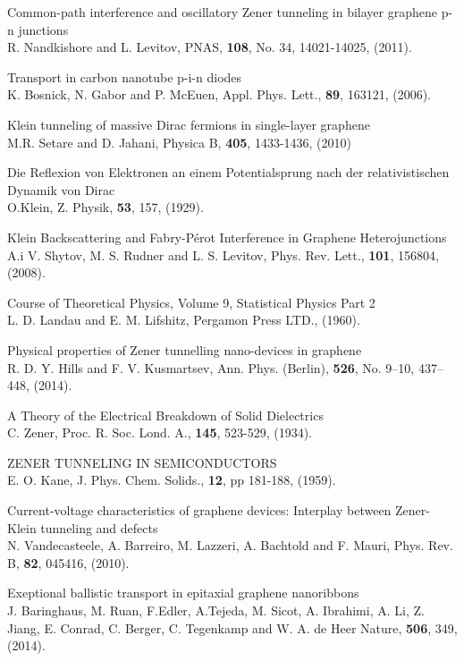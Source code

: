 \documentclass[12pt,a4paper]{report}
\begin{document}
\begin{thebibliography}{10}
 Common-path interference and oscillatory Zener tunneling in bilayer graphene p-n junctions\\
R. Nandkishore and L. Levitov,
PNAS, {\bf 108}, No. 34, 14021-14025, (2011).

Transport in carbon nanotube p-i-n diodes\\
K. Bosnick, N. Gabor and P. McEuen,
Appl. Phys. Lett., {\bf 89}, 163121, (2006).

 Klein tunneling of massive Dirac fermions in single-layer graphene\\
M.R. Setare and D. Jahani,
\newblock Physica B, {\bf 405}, 1433-1436, (2010)

 Die Reflexion von Elektronen an einem Potentialsprung nach der relativistischen Dynamik von Dirac\\
O.Klein,
Z. Physik, {\bf 53}, 157, (1929).

 Klein Backscattering and Fabry-Pérot Interference in Graphene Heterojunctions\\
A.i V. Shytov, M. S. Rudner and L. S. Levitov,
Phys. Rev. Lett., {\bf 101}, 156804, (2008).

 Course of Theoretical Physics, Volume 9, Statistical Physics Part 2\\
L. D. Landau and E. M. Lifshitz,
Pergamon Press LTD., (1960).

Physical properties of Zener tunnelling nano-devices in graphene\\
R. D. Y. Hills and F. V. Kusmartsev,
Ann. Phys. (Berlin), {\bf 526}, No. 9–10, 437–448, (2014).

 A Theory of the Electrical Breakdown of Solid Dielectrics\\
C. Zener,
Proc. R. Soc. Lond. A., {\bf 145}, 523-529, (1934).

 ZENER TUNNELING IN SEMICONDUCTORS\\
E. O. Kane,
J. Phys. Chem. Solids., {\bf 12}, pp 181-188, (1959).

Current-voltage characteristics of graphene devices: Interplay between Zener-Klein tunneling and defects\\
N. Vandecasteele, A. Barreiro, M. Lazzeri, A. Bachtold and F. Mauri,
Phys. Rev. B, {\bf 82}, 045416, (2010).

 Exeptional ballistic transport in epitaxial graphene nanoribbons\\
J. Baringhaus, M. Ruan, F.Edler, A.Tejeda, M. Sicot, A. Ibrahimi, A. Li, Z. Jiang, E. Conrad, C. Berger, C. Tegenkamp and W. A. de Heer
Nature, {\bf 506}, 349, (2014).


\end{thebibliography}
\end{document}
